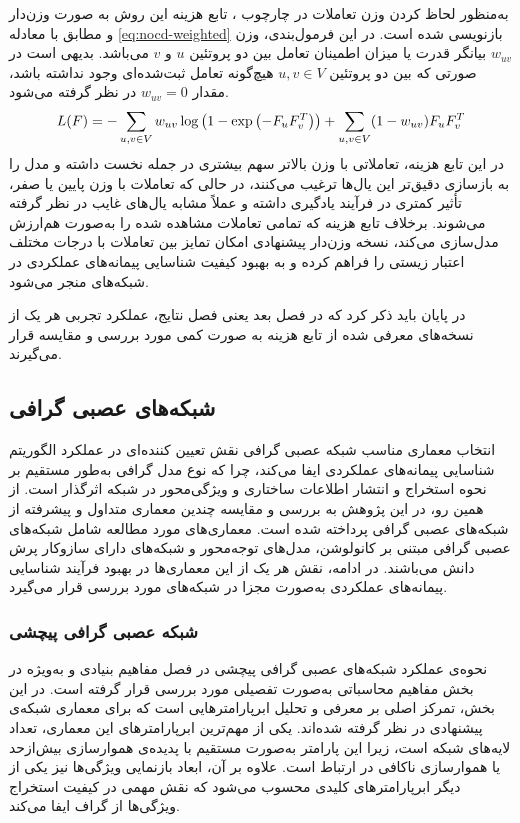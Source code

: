 به‌منظور لحاظ کردن وزن تعاملات در چارچوب ، تابع هزینه این روش به صورت وزن‌دار و مطابق با معادله \ref{eq:nocd-weighted} بازنویسی شده است. در این فرمول‌بندی، وزن $w_{uv}$ بیانگر قدرت یا میزان اطمینان تعامل بین دو پروتئین $u$ و $v$ می‌باشد. بدیهی است در صورتی که بین دو پروتئین $u,v \in V$ هیچ‌گونه تعامل ثبت‌شده‌ای وجود نداشته باشد، مقدار
$
w_{uv} = 0
$
در نظر گرفته می‌شود.
\vspace{-4mm}
\begin{equation}
	L(F) = -\sum_{u,v \in V} w_{uv} \log\left(1-\exp\left(-F_u F_v^T\right)\right)
	+ \sum_{u,v \in V} (1-w_{uv}) F_u F_v^T
	\label{eq:nocd-weighted}
	\vspace{-4mm}
\end{equation}
در این تابع هزینه، تعاملاتی با وزن بالاتر سهم بیشتری در جمله نخست داشته و مدل را به بازسازی دقیق‌تر این یال‌ها ترغیب می‌کنند، در حالی که تعاملات با وزن پایین یا صفر، تأثیر کمتری در فرآیند یادگیری داشته و عملاً مشابه یال‌های غایب در نظر گرفته می‌شوند. برخلاف تابع هزینه  که تمامی تعاملات مشاهده‌ شده را به‌صورت هم‌ارزش مدل‌سازی می‌کند، نسخه وزن‌دار پیشنهادی امکان تمایز بین تعاملات با درجات مختلف اعتبار زیستی را فراهم کرده و به بهبود کیفیت شناسایی پیمانه‌های عملکردی در شبکه‌های  منجر می‌شود.

در پایان باید ذکر کرد که در فصل بعد یعنی فصل نتایج، عملکرد تجربی هر یک از نسخه‌های معرفی شده از تابع هزینه  به صورت کمی مورد بررسی و مقایسه قرار می‌گیرند.

\subsection{شبکه‌های عصبی گرافی}
انتخاب معماری مناسب شبکه عصبی گرافی نقش تعیین‌ کننده‌ای در عملکرد الگوریتم شناسایی پیمانه‌های عملکردی ایفا می‌کند، چرا که نوع مدل گرافی به‌طور مستقیم بر نحوه استخراج و انتشار اطلاعات ساختاری و ویژگی‌محور در شبکه اثرگذار است. از همین رو، در این پژوهش به بررسی و مقایسه چندین معماری متداول و پیشرفته از شبکه‌های عصبی گرافی پرداخته شده است. معماری‌های مورد مطالعه شامل شبکه‌های عصبی گرافی مبتنی بر کانولوشن، مدل‌های توجه‌محور و شبکه‌های دارای سازوکار پرش دانش می‌باشند. در ادامه، نقش هر یک از این معماری‌ها در بهبود فرآیند شناسایی پیمانه‌های عملکردی به‌صورت مجزا در شبکه‌های  مورد بررسی قرار می‌گیرد.



\subsubsection{شبکه عصبی گرافی پیچشی}
نحوه‌ی عملکرد شبکه‌های عصبی گرافی پیچشی در فصل مفاهیم بنیادی و به‌ویژه در بخش مفاهیم محاسباتی به‌صورت تفصیلی مورد بررسی قرار گرفته است. در این بخش، تمرکز اصلی بر معرفی و تحلیل ابرپارامترهایی است که برای معماری شبکه‌ی پیشنهادی در نظر گرفته شده‌اند.
یکی از مهم‌ترین ابرپارامترهای این معماری، تعداد لایه‌های شبکه است، زیرا این پارامتر به‌صورت مستقیم با پدیده‌ی هموارسازی بیش‌از‌حد یا هموارسازی ناکافی در ارتباط است. علاوه بر آن، ابعاد بازنمایی ویژگی‌ها نیز یکی از دیگر ابرپارامترهای کلیدی محسوب می‌شود که نقش مهمی در کیفیت استخراج ویژگی‌ها از گراف ایفا می‌کند.


